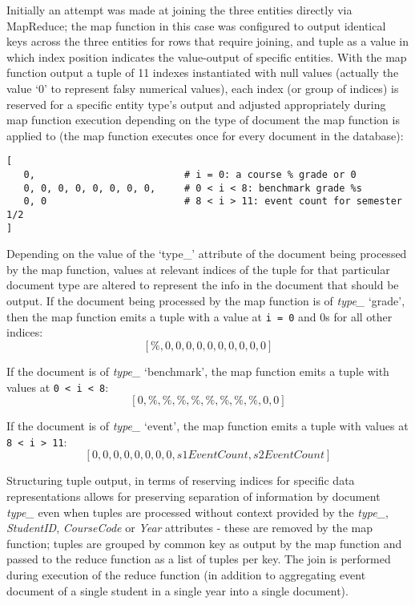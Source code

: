 Initially an attempt was made at joining the three entities directly via MapReduce; the map function in this case was configured to output identical keys across the three entities for rows that require joining, and tuple as a value in which index position indicates the value-output of specific entities. With the map function output a tuple of 11 indexes instantiated with null values (actually the value `0' to represent falsy numerical values), each index (or group of indices) is reserved for a specific entity type's output and adjusted appropriately during map function execution depending on the type of document the map function is applied to (the map function executes once for every document in the database):

\begin{verbatim}
[
   0,                          # i = 0: a course % grade or 0
   0, 0, 0, 0, 0, 0, 0, 0,     # 0 < i < 8: benchmark grade %s
   0, 0                        # 8 < i > 11: event count for semester 1/2
]
\end{verbatim}

Depending on the value of the `type\_' attribute of the document being processed by the map function, values at relevant indices of the tuple for that particular document type are altered to represent the info in the document that should be output. If the document being processed by the map function is of \textit{type\_} ‘grade’, then the map function emits a tuple with a value at \texttt{i = 0} and 0s for all other indices: \[[\%, 0, 0, 0, 0, 0, 0, 0, 0, 0, 0]\]

If the document is of \textit{type\_} `benchmark', the map function emits a tuple with values at \texttt{0 < i < 8}: \[[0, \%, \%, \%, \%, \%, \%, \%, \%, 0, 0]\]

If the document is of \textit{type\_} ‘event’, the map function emits a tuple with values at \texttt{8 < i > 11}: \[[0, 0, 0, 0, 0, 0, 0, 0, s1EventCount, s2EventCount]\]

Structuring tuple output, in terms of reserving indices for specific data representations allows for preserving separation of information by document \textit{type\_} even when tuples are processed without context provided by the \textit{type\_}, \textit{StudentID}, \textit{CourseCode} or \textit{Year} attributes - these are removed by the map function; tuples are grouped by common key as output by the map function and passed to the reduce function as a list of tuples per key. The join is performed during execution of the reduce function (in addition to aggregating event document of a single student in a single year into a single document).

